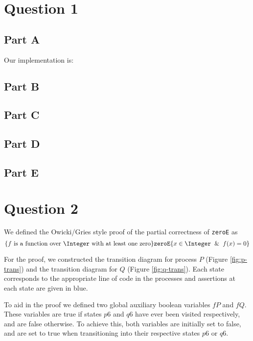 \documentclass[12pt,a4paper]{scrartcl}
\begin{document}
\section{Question 1}

\subsection{Part A}

Our implementation is:


\subsection{Part B}

\subsection{Part C}

\subsection{Part D}

\subsection{Part E}

\section{Question 2}

We defined the Owicki/Gries style proof of the partial correctness of \texttt{zeroE} as
\begin{equation}
    \{ \textrm{$f$ is a function over $\Integer$ with at least one zero} \}
    \texttt{zeroE}
    \{ x \in \Integer \And f(x)=0 \}
\label{eq:og-proof}
\end{equation}

For the proof, we constructed the transition diagram for process $P$ (Figure \ref{fig:p-trans}) and the transition diagram for $Q$ (Figure \ref{fig:q-trans}).
Each state corresponds to the appropriate line of code in the processes and assertions at each state are given in blue.

To aid in the proof we defined two global auxiliary boolean variables $fP$ and $fQ$.
These variables are true if states $p6$ and $q6$ have ever been visited respectively, and are false otherwise.
To achieve this, both variables are initially set to false, and are set to true when transitioning into their respective states $p6$ or $q6$.
\end{document}
